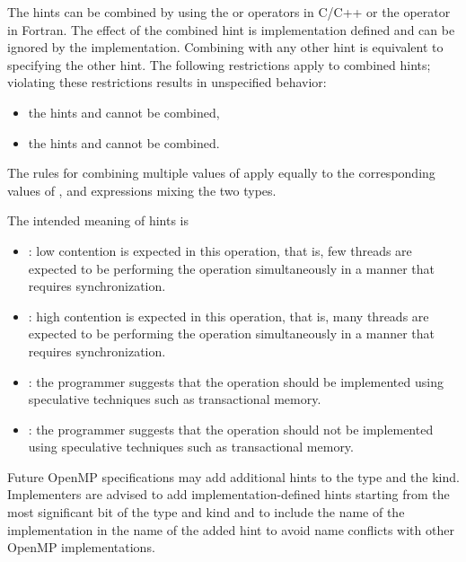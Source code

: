The hints can be combined by using the \code{+} or \code{|} operators in C/C++ or the \code{+} operator in Fortran.
The effect of the combined hint is implementation defined and can be ignored by the implementation.
Combining  with any other hint is equivalent to specifying the other hint.
The following restrictions apply to combined hints; violating these
restrictions results in unspecified behavior:
\begin{itemize}
\item the hints  and  cannot be combined,
\item the hints  and  cannot be combined.
\end{itemize}
The rules for combining multiple values of  apply equally to the
corresponding values of , and expressions mixing the two types.

The intended meaning of hints is
\begin{itemize}
\item {}: low contention is expected in this operation, that is,
few threads are expected to be performing the operation simultaneously in a manner that requires synchronization.
\item {}: high contention is expected in this operation, that is,
many threads are expected to be performing the operation simultaneously in a manner that requires synchronization.
\item {}: the programmer suggests that the operation should be implemented using
speculative techniques such as transactional memory.
\item {}: the programmer suggests that the operation should not be
implemented using speculative techniques such as transactional memory.
\end{itemize}

\begin{note}
Future OpenMP specifications may add additional hints to the
 type and the  kind.
Implementers are advised to add implementation-defined hints starting from
the most significant bit of the  type and
 kind and to include the name of the
implementation in the name of the added hint to avoid name conflicts
with other OpenMP implementations.
\end{note}

